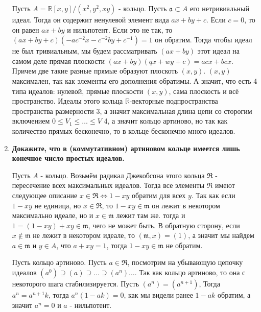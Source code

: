 \documentclass{article}
\begin{document}
\begin{enumerate}
        Пусть $A=\mathbb{R}[x,y]/(x^2,y^2,xy)$ - кольцо. Пусть $\mathfrak{a}
        \subset A$ его нетривиальный идеал. Тогда он содержит ненулевой элемент
        вида $ax+by+c$. Если $c=0$, то он равен $ax+by$ и нильпотент. Если это
        не так, то $(ax+by+c)(-ac^{-2}x-c^{-2}by+c^{-1})=1$ он обратим. Тогда
        чтобы идеал не был тривиальным, мы будем рассматривать $(ax+by)$ этот
        идеал на самом деле прямая плоскости $(ax+by)(qx+wy+c)=acx+bcx$.
        Причем две такие разные прямые образуют плоскоть $(x,y)$. $(x,y)$
        максимален, так как элементы его дополнения обратимы. А значит, что есть
        4 типа идеалов: нулевой, прямые плоскости $(x,y)$, сама плоскость и всё
        пространство. Идеалы этого кольца $\mathbb{R}$-векторные подпространства
        пространства размерности 3, а значит максимальная длина цепи со сторогим
        включением $0\leq V_1\leq\ldots \leq V$ 4, а значит кольцо артиново, но
        так как количество прямых бесконечно, то в кольце бесконечно много идеалов.

    \item \textbf{Докажите, что в (коммутативном) артиновом кольце
        имеется лишь конечное число простых идеалов.}

        Пусть $A$ - кольцо. Возьмём радикал Джекобсона этого
        кольца $\mathfrak{R}$ - пересечение всех максимальных идеалов.
        Тогда все элементы $\mathfrak{R}$ имеют следующее описание $x\in\mathfrak{R}
        \Leftrightarrow 1-xy$ обратим для всех $y$. Так как если $1-xy$ не
        единица, но $x\in\mathfrak{R}$, то $1-xy\in\mathfrak{m}$ он лежит в
        некотором максимально идеале, но и $x\in\mathfrak{m}$ лежит там же.
        тогда и $1=(1-xy)+xy\in\mathfrak{m}$, чего не может быть. В обратную
        сторону, если $x\notin\mathfrak{m}$ не лежит в некотором идеале, то
        $(\mathfrak{m},x)=(1)$, а значит мы найдем $a\in\mathfrak{m}$ и $y\in A$,
        что $a+xy=1$, тогда $1-xy\in\mathfrak{m}$ не обратим.

        Пусть кольцо артиново. Пусть $a\in\mathfrak{R}$, посмотрим на
        убывающую цепочку идеалов $(a^0)\supseteq (a)\supseteq\ldots\supseteq(a^n)
        \ldots$. Так как кольцо артиново, то она с некоторого шага стабилизируется.
        Пусть $(a^n)=(a^{n+1})$, Тогда $a^n=a^{n+1}k$, тогда $a^n(1-ak)=0$, как
        мы видели ранее $1-ak$ обратим, а значит $a^n=0$ и $a$ - нильпотент.


\end{enumerate}
\end{document}
